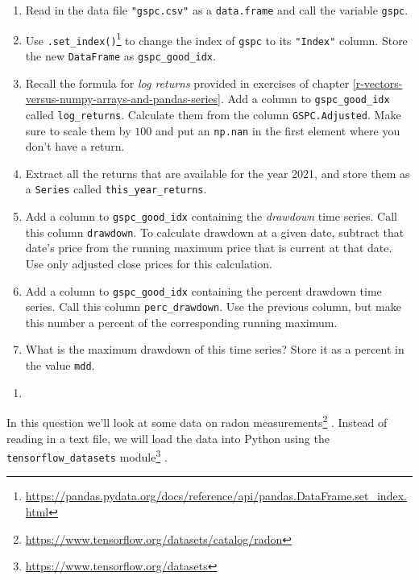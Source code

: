 \documentclass[12pt,krantz2]{krantz}
\providecommand{\tightlist}{%
  \setlength{\itemsep}{0pt}\setlength{\parskip}{0pt}}
\renewcommand{\href}[2]{#2\footnote{\url{#1}}}
\begin{document}
\begin{enumerate}
\def\labelenumi{\alph{enumi})}
\tightlist
\item
  Read in the data file \texttt{"gspc.csv"} as a \texttt{data.frame} and call the variable \texttt{gspc}.
\item
  Use \href{https://pandas.pydata.org/docs/reference/api/pandas.DataFrame.set_index.html}{\texttt{.set\_index()}} to change the index of \texttt{gspc} to its \texttt{"Index"} column. Store the new \texttt{DataFrame} as \texttt{gspc\_good\_idx}.
\item
  Recall the formula for \emph{log returns} provided in exercises of chapter \ref{r-vectors-versus-numpy-arrays-and-pandas-series}. Add a column to \texttt{gspc\_good\_idx} called \texttt{log\_returns}. Calculate them from the column \texttt{GSPC.Adjusted}. Make sure to scale them by \(100\) and put an \texttt{np.nan} in the first element where you don't have a return.
\item
  Extract all the returns that are available for the year 2021, and store them as a \texttt{Series} called \texttt{this\_year\_returns}.
\item
  Add a column to \texttt{gspc\_good\_idx} containing the \emph{drawdown} time series. Call this column \texttt{drawdown}. To calculate drawdown at a given date, subtract that date's price from the running maximum price that is current at that date. Use only adjusted close prices for this calculation.\\
\item
  Add a column to \texttt{gspc\_good\_idx} containing the percent drawdown time series. Call this column \texttt{perc\_drawdown}. Use the previous column, but make this number a percent of the corresponding running maximum.
\item
  What is the maximum drawdown of this time series? Store it as a percent in the value \texttt{mdd}.
\end{enumerate}

\begin{enumerate}
\def\labelenumi{\arabic{enumi}.}
\setcounter{enumi}{1}
\item
\end{enumerate}

In this question we'll look at \href{https://www.tensorflow.org/datasets/catalog/radon}{some data on radon measurements} \citep{GelmanHill:2007}. Instead of reading in a text file, we will load the data into Python using the \href{https://www.tensorflow.org/datasets}{\texttt{tensorflow\_datasets} module} \citep{TFDS}.
\end{document}
